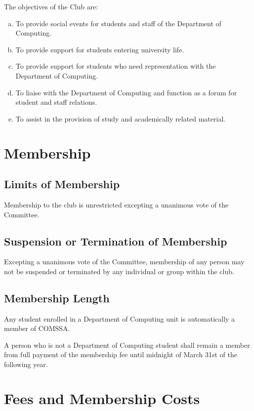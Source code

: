 \documentclass[a4paper,12pt]{article}
\begin{document}
The objectives of the Club are:

\begin{enumerate}[a)]
	\item To provide social events for students and staff of the Department of Computing.
	\item To provide support for students entering university life.
	\item To provide support for students who need representation with the Department of Computing.
	\item To liaise with the Department of Computing and function as a forum for student and staff relations.
	\item To assist in the provision of study and academically related material.
\end{enumerate}

\section{Membership}

\subsection{Limits of Membership}

Membership to the club is unrestricted excepting a unanimous vote of the Committee.

\subsection{Suspension or Termination of Membership}

Excepting a unanimous vote of the Committee, membership of any person may not be suspended or terminated by any individual or group within the club.

\subsection{Membership Length}

Any student enrolled in a Department of Computing unit is automatically a member of COMSSA.

A person who is not a Department of Computing student shall remain a member from full payment of the membership fee until midnight of March 31st of the following year.

\section{Fees and Membership Costs}
\end{document}
